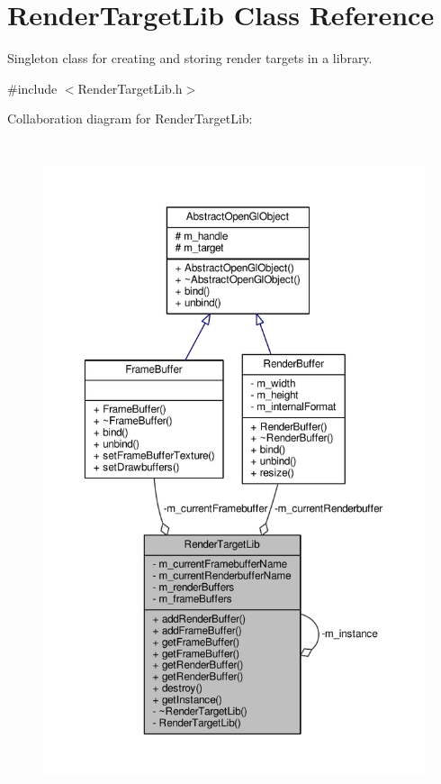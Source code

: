 \hypertarget{class_render_target_lib}{\section{Render\-Target\-Lib Class Reference}
\label{class_render_target_lib}
}


Singleton class for creating and storing render targets in a library.  




{\ttfamily \#include $<$Render\-Target\-Lib.\-h$>$}



Collaboration diagram for Render\-Target\-Lib\-:\nopagebreak
\begin{figure}[H]
\begin{center}
\leavevmode
\includegraphics[height=550pt]{class_render_target_lib__coll__graph}
\end{center}
\end{figure}
